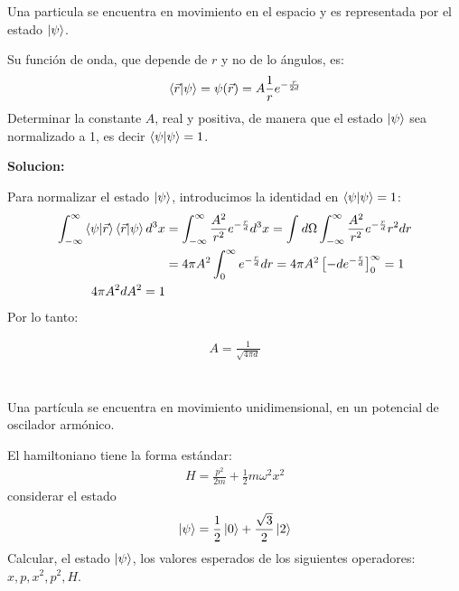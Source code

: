 \documentclass{article}
\newcommand{\caja}[3]{%
  \begin{tcolorbox}[colback=#1!5!white,colframe=#1!25!black,title=#2]
    #3
  \end{tcolorbox}%
}
\begin{document}

\section{}
Una particula se encuentra en movimiento en el espacio y es representada por el estado $ \ket{\psi} $. 

Su función de onda, que depende de $ r  $ y no de lo ángulos, es: 
\begin{gather*}
  \bra{\vec r }\ket{\psi} = \psi(\vec r ) = A \frac{1}{r} e^{- \frac{r }{2d }}  
\end{gather*}
Determinar la constante $ A  $, real y positiva, de manera que el estado $ \ket{\psi} $ sea normalizado a 1, es decir $ \bra{\psi}\ket{\psi} = 1  $.

\textbf{Solucion: }

Para normalizar el estado $ \ket{\psi} $, introducimos la identidad en $ \bra{\psi}\ket{\psi}  =1 $: 
\begin{align*}
  \displaystyle\int_{-\infty}^{\infty}\bra{\psi}\ket{\vec r } \bra{\vec r }\ket{\psi} d^3 x &= \displaystyle\int_{- \infty}^{\infty} \frac{A^2 }{r^2 } e ^ {- \frac{r }{d }} d^3x = \displaystyle\int_{}^{}d\Omega \displaystyle\int_{- \infty}^{\infty}\frac{A^2 }{r^2 } e ^ {- \frac{r }{d }} r^2 dr\\
  &= 4\pi A^2 \displaystyle\int_{0 }^{\infty} e ^ {- \frac{r }{d }}dr = 4\pi A^2 \left[-d e ^ {-\frac{r }{d }}\right]_0^\infty = 1\\
  4 \pi A^2 dA^2 = 1 
\end{align*}
Por lo tanto: 
\caja{red}{}{
  \begin{gather*}
    A = \frac{1}{\sqrt{4\pi d } } 
  \end{gather*}
}


\section{}
Una partícula se encuentra en movimiento unidimensional, en un potencial de oscilador armónico. 

\hfill

El hamiltoniano tiene la forma estándar: 
\begin{gather*}
  H = \frac{p^2 }{2m } + \frac{1}{2}m \omega^2 x^2  
\end{gather*}
considerar el estado 
\begin{gather*}
  \ket{\psi} = \frac{1}{2}\ket{0 } + \frac{\sqrt{3 } }{2 }\ket{2 } 
\end{gather*}
Calcular, el estado $ \ket{\psi} $, los valores esperados de los siguientes operadores: $ x, p , x^2, p^2, H  $.
\end{document}
